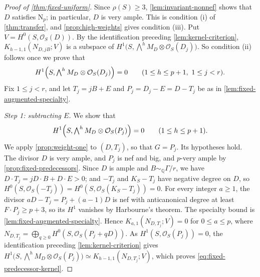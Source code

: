 \documentclass[11pt,reqno]{amsart}
\numberwithin{equation}{section}
\theoremstyle{remark}
\newcommand{\sshf}[1]{\mathcal{O}_{#1}}
\newcommand{\NP}{\mathrm N}
\begin{document}
\begin{proof}[Proof of \cref{thm:fixed-uniform}]
Since \(\rho(S)\geq3\), \cref{lem:invariant-nonnef} shows that \(D\) satisfies \(\NP_p\); in particular, \(D\) is very ample. This is condition \textup{(i)} of \cref{thm:transfer}, and \cref{prop:high-weights} gives condition \textup{(iii)}. Put \(V=H^0(S,\sshf{S}(D))\). By the identification preceding \cref{lem:kernel-criterion}, \(K_{h-1,1}(N_{D,jB};V)\) is a subspace of \(H^1\bigl(S,\bigwedge^hM_D\otimes\sshf{S}(D_j)\bigr)\). So condition \textup{(ii)} follows once we prove that
\begin{equation}\label{eq:fixed-target}
 H^1\Bigl(S,\textstyle\bigwedge^hM_D\otimes\sshf{S}(D_j)\Bigr)=0
 \qquad(1\leq h\leq p+1,\ 1\leq j<r).
\end{equation}
Fix \(1\leq j<r\), and let \(T_j=jB+E\) and \(P_j=D_j-E=D-T_j\) be as in \cref{lem:fixed-augmented-specialty}.

\smallskip\noindent\emph{Step 1: subtracting \(E\).} We show that
\begin{equation}\label{eq:fixed-predecessor-kernel}
 H^1\Bigl(S,\textstyle\bigwedge^hM_D\otimes\sshf{S}(P_j)\Bigr)=0
 \qquad(1\leq h\leq p+1).
\end{equation}
We apply \cref{prop:weight-one} to \((D,T_j)\), so that \(G=P_j\). Its hypotheses hold. The divisor \(D\) is very ample, and \(P_j\) is nef and big, and \(p\)-very ample by \cref{prop:fixed-predecessors}. Since \(D\) is ample and \(B\sim_{\mathbb Q}\Gamma/r\), we have \(D\cdot T_j=jD\cdot B+D\cdot E>0\); and \(-T_j\) and \(K_S-T_j\) have negative degree on \(D\), so \(H^0(S,\sshf{S}(-T_j))=H^0(S,\sshf{S}(K_S-T_j))=0\). For every integer \(a\geq1\), the divisor \(aD-T_j=P_j+(a-1)D\) is nef with anticanonical degree at least \(F\cdot P_j\geq p+3\), so its \(H^1\) vanishes by Harbourne's theorem. The specialty bound is \cref{lem:fixed-augmented-specialty}. Hence \(K_{a,1}(N_{D,T_j};V)=0\) for \(0\leq a\leq p\), where \(N_{D,T_j}=\bigoplus_{q\geq0}H^0(S,\sshf{S}(P_j+qD))\). As \(H^1(S,\sshf{S}(P_j))=0\), the identification preceding \cref{lem:kernel-criterion} gives \(H^1\bigl(S,\bigwedge^hM_D\otimes\sshf{S}(P_j)\bigr)\simeq K_{h-1,1}(N_{D,T_j};V)\), which proves \eqref{eq:fixed-predecessor-kernel}.


\end{proof}
\end{document}
